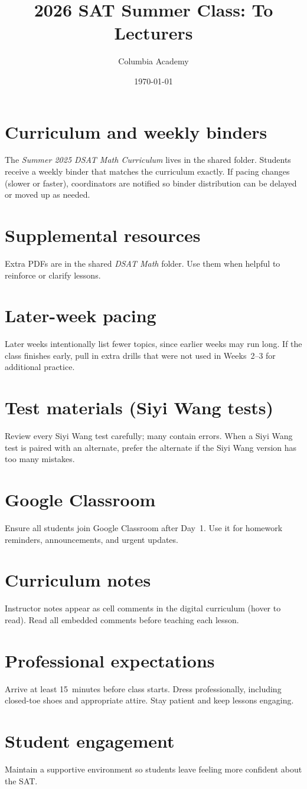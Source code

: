\documentclass[letterpaper]{article}
\title{\textbf{2026 SAT Summer Class: To Lecturers}}
\author{Columbia Academy}
\date{\today}
\begin{document}
\maketitle
\thispagestyle{plain}

\section{Curriculum and weekly binders}
The \emph{Summer 2025 DSAT Math Curriculum} lives in the shared folder. Students receive a weekly binder that matches the curriculum exactly. If pacing changes (slower or faster), coordinators are notified so binder distribution can be delayed or moved up as needed.

\section{Supplemental resources}
Extra PDFs are in the shared \emph{DSAT Math} folder. Use them when helpful to reinforce or clarify lessons.

\section{Later-week pacing}
Later weeks intentionally list fewer topics, since earlier weeks may run long. If the class finishes early, pull in extra drills that were not used in Weeks~2--3 for additional practice.

\section{Test materials (Siyi Wang tests)}
Review every Siyi Wang test carefully; many contain errors. When a Siyi Wang test is paired with an alternate, prefer the alternate if the Siyi Wang version has too many mistakes.

\section{Google Classroom}
Ensure all students join Google Classroom after Day~1. Use it for homework reminders, announcements, and urgent updates.

\section{Curriculum notes}
Instructor notes appear as cell comments in the digital curriculum (hover to read). Read all embedded comments before teaching each lesson.

\section{Professional expectations}
Arrive at least 15~minutes before class starts. Dress professionally, including closed-toe shoes and appropriate attire. Stay patient and keep lessons engaging.

\section{Student engagement}
Maintain a supportive environment so students leave feeling more confident about the SAT.
\end{document}

